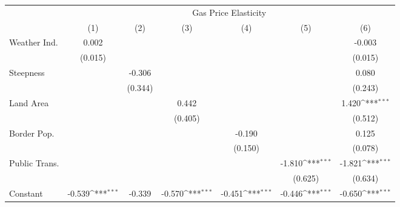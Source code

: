 {
\def\sym#1{\ifmmode^{#1}\else\(^{#1}\)\fi}
\begin{tabular}{l*{6}{c}}
\hline\hline
            &\multicolumn{6}{c}{Gas Price Elasticity}                                                                                           \\
            &\multicolumn{1}{c}{(1)}         &\multicolumn{1}{c}{(2)}         &\multicolumn{1}{c}{(3)}         &\multicolumn{1}{c}{(4)}         &\multicolumn{1}{c}{(5)}         &\multicolumn{1}{c}{(6)}         \\
\hline
Weather Ind.&       0.002         &                     &                     &                     &                     &      -0.003         \\
            &     (0.015)         &                     &                     &                     &                     &     (0.015)         \\
[1em]
Steepness   &                     &      -0.306         &                     &                     &                     &       0.080         \\
            &                     &     (0.344)         &                     &                     &                     &     (0.243)         \\
[1em]
Land Area   &                     &                     &       0.442         &                     &                     &       1.420\sym{***}\\
            &                     &                     &     (0.405)         &                     &                     &     (0.512)         \\
[1em]
Border Pop. &                     &                     &                     &      -0.190         &                     &       0.125         \\
            &                     &                     &                     &     (0.150)         &                     &     (0.078)         \\
[1em]
Public Trans.&                     &                     &                     &                     &      -1.810\sym{***}&      -1.821\sym{***}\\
            &                     &                     &                     &                     &     (0.625)         &     (0.634)         \\
[1em]
Constant    &      -0.539\sym{***}&      -0.339         &      -0.570\sym{***}&      -0.451\sym{***}&      -0.446\sym{***}&      -0.650\sym{***}\\

\end{tabular}}
